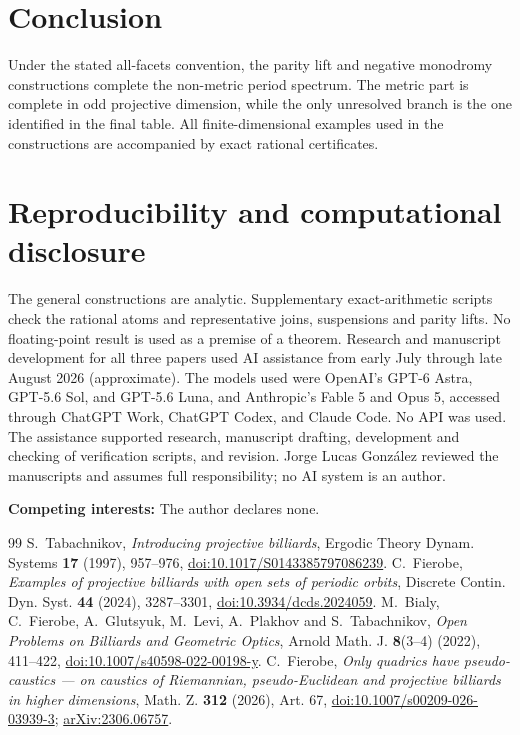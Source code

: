 \documentclass[11pt,a4paper]{article}
\theoremstyle{plain}
\theoremstyle{definition}
\theoremstyle{remark}
\begin{document}
\section{Conclusion}
Under the stated all-facets convention, the parity lift and negative
monodromy constructions complete the non-metric period spectrum.  The metric
part is complete in odd projective dimension, while the only unresolved branch
is the one identified in the final table.  All finite-dimensional examples used
in the constructions are accompanied by exact rational certificates.
\newpage
\section*{Reproducibility and computational disclosure}
The general constructions are analytic. Supplementary exact-arithmetic scripts
check the rational atoms and representative joins, suspensions and parity lifts.
No floating-point result is used as a premise of a theorem. Research and manuscript development for all three papers used AI assistance from early
July through late August 2026 (approximate). The models used were OpenAI's GPT-6 Astra,
GPT-5.6 Sol, and GPT-5.6 Luna, and Anthropic's Fable 5 and Opus 5, accessed through
ChatGPT Work, ChatGPT Codex, and Claude Code. No API was used. The assistance supported
research, manuscript drafting, development and checking of verification scripts, and revision.
Jorge Lucas Gonz\'alez reviewed the manuscripts and assumes full responsibility; no AI
system is an author.
\par\medskip
\noindent\textbf{Competing interests:} The author declares none.
\par\medskip
\begin{thebibliography}{99}
\footnotesize
\enlargethispage{2\baselineskip}
 S.~Tabachnikov, \emph{Introducing projective billiards},
Ergodic Theory Dynam. Systems \textbf{17} (1997), 957--976,
\href{https://doi.org/10.1017/S0143385797086239}{doi:10.1017/S0143385797086239}.
 C.~Fierobe, \emph{Examples of projective billiards with open
sets of periodic orbits}, Discrete Contin. Dyn. Syst. \textbf{44} (2024),
3287--3301, \href{https://doi.org/10.3934/dcds.2024059}{doi:10.3934/dcds.2024059}.
 M.~Bialy, C.~Fierobe, A.~Glutsyuk, M.~Levi, A.~Plakhov and
S.~Tabachnikov, \emph{Open Problems on Billiards and Geometric Optics},
Arnold Math. J. \textbf{8}(3--4) (2022), 411--422,
\href{https://doi.org/10.1007/s40598-022-00198-y}{doi:10.1007/s40598-022-00198-y}.
 C.~Fierobe, \emph{Only quadrics have pseudo-caustics ---
on caustics of Riemannian, pseudo-Euclidean and projective billiards in higher
dimensions}, Math. Z. \textbf{312} (2026), Art. 67,
\href{https://doi.org/10.1007/s00209-026-03939-3}{doi:10.1007/s00209-026-03939-3};
\href{https://arxiv.org/abs/2306.06757}{arXiv:2306.06757}.
\end{thebibliography}
\end{document}
